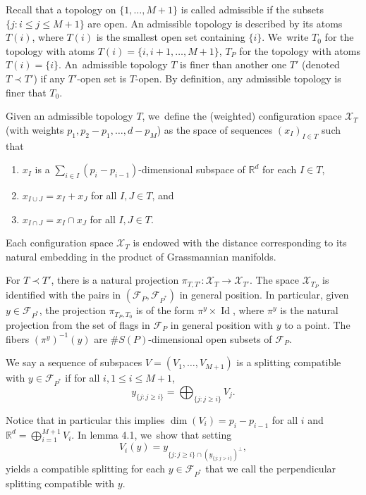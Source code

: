 \documentclass[JEP,XML,SOM,Unicode,NoEqCountersInSection,published]{cedram}
\newcommand{\R}{\mathbb{R}}
\newcommand{\F}{\mathcal{F}}
\newcommand{\X}{\mathcal{X}}
\let\x\times
\DeclareMathOperator{\id}{Id}
\begin{document}
Recall that a topology on \(\{ 1,\ldots, M +1\}\) is called admissible if the subsets \hbox{\(\{j: i \le j \le M+1\}\)} are open. An admissible topology is described by its atoms \(T(i)\), where \(T(i)\) is the smallest open set containing \(\{i\} \). We~write \(T_0\) for the topology with atoms \(T(i) =\{ i,i+1, \ldots, M+1\}\), \(T_P\) for the topology with atoms \(T(i) =\{ i\}\). An~admissible topology \(T\) is finer than another one \(T'\) (denoted \(T \prec T'\)) if any \(T' \)-open set is \(T\)-open. By definition, any admissible topology is finer that \(T_0\).

Given an admissible topology \(T\), we~define the (weighted) configuration space \(\X_T\) (with weights \(p_1,p_2-p_1,\ldots,d-p_{M}\)) as the space of sequences \((x_I)_{I \in T}\) such that
\begin{enumerate}
\item \(x_I\) is a \(\sum_{i\in I}(p_i -p_{i-1})\)-dimensional subspace of \(\R^d\) for each \(I \in T\),
\item \(x_{I \cup J} = x_I + x_J\) for all \(I,J \in T\), and
\item \(x_{I\cap J} = x_I \cap x_J\) for all \(I,J \in T\).
\end{enumerate}

Each configuration space \(\X_T\) is endowed with the distance corresponding to its natural embedding in the product of Grassmannian manifolds.

For \(T \prec T'\), there is a natural projection \(\pi_{T,T'} : \X_T \to \X_{T'} \). The space \(\X_{T_P} \) is identified with the pairs in \((\F_{P}, \F_{P^\ast})\) in general position. In particular, given \(y \in \F_{P^\ast} \), the projection \(\pi_{T_P, T_{0}} \) is of the form \(\pi^y \x \id\), where \(\pi^y \) is the natural projection from the set of flags in \(\F_{P}\) in general position with \(y\) to a point. The fibers \((\pi^y)^{-1} (y)\) are \(\# S(P) \)-dimensional open subsets of \(\F_{P}\).

We say a sequence of subspaces \(V = (V_1,\ldots, V_{M+1})\) is a splitting compatible with \(y \in \F_{P^\ast} \) if for all \(i, 1\leq i \leq M+1\),\vspace*{-3pt}
\begin{equation}\label{compatiblesplittingequation}
y_{\{j: j\geq {i}\}} = \bigoplus_{\{j: j\ge i\}}V_j.
\end{equation}

Notice that in particular this implies \(\dim(V_i) = p_i - p_{i-1}\) for all \(i\) and \(\R^d = \bigoplus_{i = 1}^{M+1} V_i\).
In \cite{LL23} lemma 4.1, we~show that setting\vspace*{-3pt}
\begin{equation}\label{perpcompatiblesplitting}
V_i(y) = y_{\{j: j\geq {i}\} \cap \left(y_{\{j: j>i\}} \right)^{\perp}},
\end{equation}
yields a compatible splitting for each \(y \in \F_{P^\ast} \) that we call the perpendicular splitting compatible with \(y\).
\end{document}
